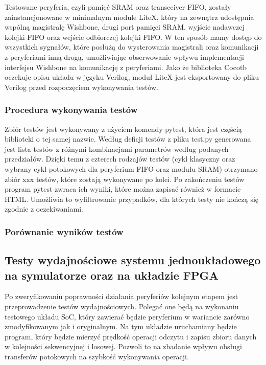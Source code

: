 
Testowane peryferia, czyli pamięć SRAM oraz transceiver FIFO, zostały zainstancjonowane w minimalnym module LiteX, który na zewnątrz udostępnia wspólną magistralę Wishbone, drugi port pamięci SRAM, wyjście nadawczej kolejki FIFO oraz wejście odbiorczej kolejki FIFO. W ten sposób mamy dostęp do wszystkich sygnałów, które posłużą do wysterowania magistrali oraz komunikacji z peryferiami inną drogą, umożliwiając obserwowanie wpływu implementacji interfejsu Wishbone na komunikację z peryferiami. Jako że biblioteka Cocotb oczekuje opisu układu w języku Verilog, moduł LiteX jest eksportowany do pliku Verilog przed rozpoczęciem wykonywania testów.


\subsubsection{Procedura wykonywania testów}
Zbiór testów jest wykonywany z użyciem komendy pytest, która jest częścią biblioteki o tej samej nazwie. Według deficji testów z pliku test.py generowana jest lista testów z różnymi kombinacjami parametrów według podanych przedziałów. Dzięki temu z czterech rodzajów testów (cykl klasyczny oraz wybrany cykl potokowych dla peryferium FIFO oraz modułu SRAM) otrzymano zbiór xxx testów, które zostają wykonywane po kolei. Po zakończeniu testów program pytest zwraca ich wyniki, które można zapisać również w formacie HTML. Umożliwia to wyfiltrowanie przypadków, dla których testy nie kończą się zgodnie z oczekiwaniami.


\subsubsection{Porównanie wyników testów}


\subsection{Testy wydajnościowe systemu jednoukładowego na symulatorze oraz na układzie FPGA}

Po zweryfikowaniu poprawności działania peryferiów kolejnym etapem jest przeprowadzenie testów wydajnościowych. Polegać one będą na wykonaniu testowego układu SoC, który zawierać będzie peryferium w wariancie zarówno zmodyfikowanym jak i oryginalnym. Na tym układzie uruchamiany będzie program, który będzie mierzyć prędkość operacji odczytu i zapisu zbioru danych w kolejności sekwencyjnej i losowej. Pozwoli to na zbadanie wpływu obsługi transferów potokowych na szybkość wykonywania operacji.

